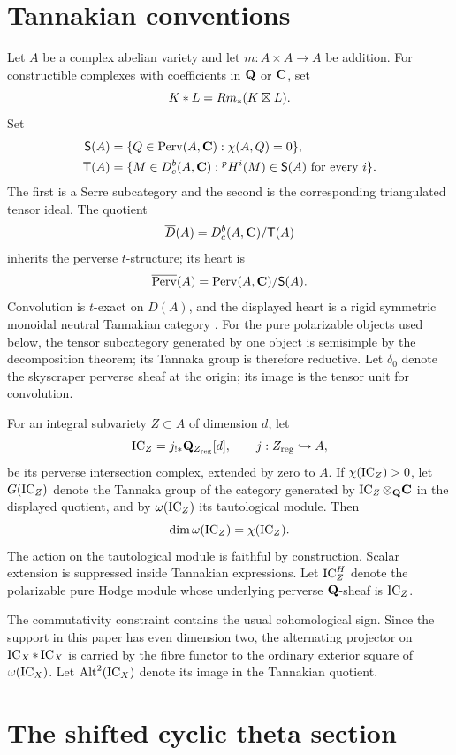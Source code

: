 \section{Tannakian conventions}

Let $A$ be a complex abelian variety and let $m:A\times A\to A$ be addition.
For constructible complexes with coefficients in $\mathbf Q$ or $\mathbf C$, set
\[
K*L=Rm_*(K\boxtimes L).
\]
Set
\[
 \begin{aligned}
 \mathsf S(A)&=\{Q\in\operatorname{Perv}(A,\mathbf C):\chi(A,Q)=0\},\\
 \mathsf T(A)&=\{M\in D_c^b(A,\mathbf C):{}^pH^i(M)\in\mathsf S(A)
                   \text{ for every }i\}.
 \end{aligned}
\]
The first is a Serre subcategory and the second is the corresponding
triangulated tensor ideal.  The quotient
\[
 \overline D(A)=D_c^b(A,\mathbf C)/\mathsf T(A)
\]
inherits the perverse $t$-structure; its heart is
\[
 \overline{\operatorname{Perv}}(A)
   =\operatorname{Perv}(A,\mathbf C)/\mathsf S(A).
\]
Convolution is $t$-exact on $\overline D(A)$, and the displayed heart is a
rigid symmetric monoidal neutral Tannakian category
\cite[Proposition~3.1]{JKLM2025}.  For the pure polarizable objects used
below, the tensor subcategory generated by one object is semisimple by the
decomposition theorem; its Tannaka group is therefore reductive.
Let $\delta_0$ denote the skyscraper perverse sheaf at the origin; its
image is the tensor unit for convolution.

For an integral subvariety $Z\subset A$ of dimension $d$, let
\[
 \operatorname{IC}_Z=j_{!*}\mathbf Q_{Z_{\mathrm{reg}}}[d],
 \qquad j:Z_{\mathrm{reg}}\hookrightarrow A,
\]
be its perverse intersection complex, extended by zero to $A$.  If
$\chi(\operatorname{IC}_Z)>0$, let $G(\operatorname{IC}_Z)$ denote the Tannaka group of the category
generated by $\operatorname{IC}_Z\otimes_{\mathbf Q}\mathbf C$ in the displayed quotient, and by
$\omega(\operatorname{IC}_Z)$ its tautological module.  Then
\[
 \dim\omega(\operatorname{IC}_Z)=\chi(\operatorname{IC}_Z).
\]
The action on the tautological module is faithful by construction.  Scalar
extension is suppressed inside Tannakian expressions.  Let $\operatorname{IC}_Z^H$ denote
the polarizable pure Hodge module whose underlying
perverse $\mathbf Q$-sheaf is $\operatorname{IC}_Z$.

The commutativity constraint contains the usual cohomological sign.  Since
the support in this paper has even dimension two, the alternating projector
on $\operatorname{IC}_X*\operatorname{IC}_X$ is carried by the fibre functor to the ordinary exterior
square of $\omega(\operatorname{IC}_X)$.  Let $\operatorname{Alt}^2(\operatorname{IC}_X)$ denote its image in the
Tannakian quotient.

\section{The shifted cyclic theta section}

